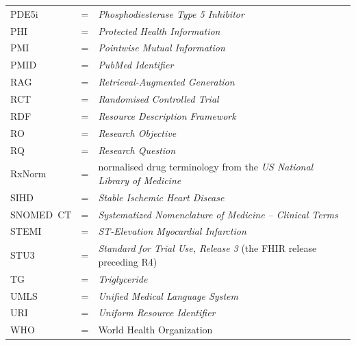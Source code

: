 \begin{longtable}{llp{3.6in}}
	PDE5i   & \hspace{1cm} = & \emph{Phosphodiesterase Type 5 Inhibitor} \\
	PHI     & \hspace{1cm} = & \emph{Protected Health Information} \\
	PMI     & \hspace{1cm} = & \emph{Pointwise Mutual Information} \\
	PMID    & \hspace{1cm} = & \emph{PubMed Identifier} \\
	RAG     & \hspace{1cm} = & \emph{Retrieval-Augmented Generation} \\
	RCT     & \hspace{1cm} = & \emph{Randomised Controlled Trial} \\
	RDF     & \hspace{1cm} = & \emph{Resource Description Framework} \\
	RO      & \hspace{1cm} = & \emph{Research Objective} \\
	RQ      & \hspace{1cm} = & \emph{Research Question} \\
	RxNorm  & \hspace{1cm} = & normalised drug terminology from the \emph{US National Library of Medicine} \\
	SIHD    & \hspace{1cm} = & \emph{Stable Ischemic Heart Disease} \\
	SNOMED~CT & \hspace{1cm} = & \emph{Systematized Nomenclature of Medicine -- Clinical Terms} \\
	STEMI   & \hspace{1cm} = & \emph{ST-Elevation Myocardial Infarction} \\
	STU3    & \hspace{1cm} = & \emph{Standard for Trial Use, Release 3} (the FHIR release preceding R4) \\
	TG      & \hspace{1cm} = & \emph{Triglyceride} \\
	UMLS    & \hspace{1cm} = & \emph{Unified Medical Language System} \\
	URI     & \hspace{1cm} = & \emph{Uniform Resource Identifier} \\
	WHO     & \hspace{1cm} = & World Health Organization 
\end{longtable}

